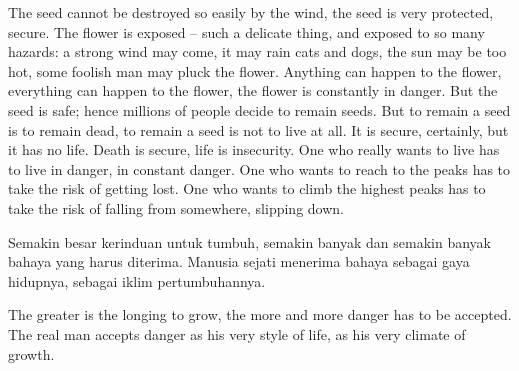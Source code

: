 \english
The seed cannot be destroyed so easily by the wind, the seed is very protected, secure. The flower is exposed -- such a delicate thing, and exposed to so many hazards: a strong wind may come, it may rain cats and dogs, the sun may be too hot, some foolish man may pluck the flower. Anything can happen to the flower, everything can happen to the flower, the flower is constantly in danger. But the seed is safe; hence millions of people decide to remain seeds. But to remain a seed is to remain dead, to remain a seed is not to live at all. It is secure, certainly, but it has no life. Death is secure, life is insecurity. One who really wants to live has to live in danger, in constant danger. One who wants to reach to the peaks has to take the risk of getting lost. One who wants to climb the highest peaks has to take the risk of falling from somewhere, slipping down.

\bahasa
Semakin besar kerinduan untuk tumbuh, semakin banyak dan semakin banyak bahaya yang harus diterima. Manusia sejati menerima bahaya sebagai gaya hidupnya, sebagai iklim pertumbuhannya.

\english
The greater is the longing to grow, the more and more danger has to be accepted. The real man accepts danger as his very style of life, as his very climate of growth.




